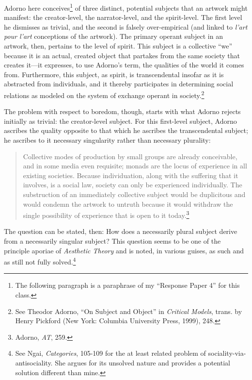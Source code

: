 \documentclass[12pt]{article}
\begin{document}
\noindent Adorno here conceives\footnote{The following paragraph is a paraphrase of my ``Response Paper 4'' for this class.} of three distinct, potential subjects that an artwork might manifest: the creator-level, the narrator-level, and the spirit-level. The first level he dismisses as trivial, and the second is falsely over-empirical (and linked to \textit{l'art pour l'art} conceptions of the artwork). The primary operant subject in an artwork, then, pertains to the level of spirit. This subject is a collective ``we'' because it is an actual, created object that partakes from the same society that creates it---it expresses, to use Adorno's term, the qualities of the world it comes from. Furthermore, this subject, as spirit, is transcendental insofar as it is abstracted from individuals, and it thereby participates in determining social relations as modeled on the system of exchange operant in society.\footnote{See Theodor Adorno, ``On Subject and Object'' in \textit{Critical Models}, trans. by Henry Pickford (New York: Columbia University Press, 1999), 248.}  

The problem with respect to boredom, though, starts with what Adorno rejects initially as trivial: the creator-level subject. For this first-level subject, Adorno ascribes the quality opposite to that which he ascribes the transcendental subject; he ascribes to it necessary singularity rather than necessary plurality:  

\begin{quote}
\begin{singlespace}
Collective modes of production by small groups are already conceivable, and in some media even requisite; monads are the locus of experience in all existing societies. Because individuation, along with the suffering that it involves, is a social law, society can only be experienced individually. The substruction of an immediately collective subject would be duplicitous and would condemn the artwork to untruth because it would withdraw the single possibility of experience that is open to it today.\footnote{Adorno, \textit{AT}, 259.}
\end{singlespace}
\end{quote}

\noindent The question can be stated, then: How does a necessarily plural subject derive from a necessarily singular subject? This question seems to be one of the principle aporiae of \textit{Aesthetic Theory} and is noted, in various guises, as such and as still not fully solved.\footnote{See Ngai, \textit{Categories}, 105-109 for the at least related problem of sociality-via-antisociality. She argues for its unsolved nature and provides a potential solution different than mine.}  
\end{document}
